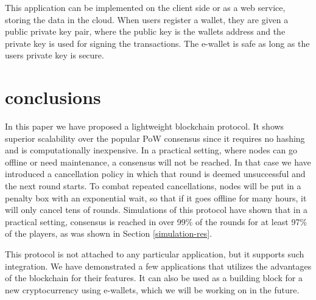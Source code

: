 \documentclass[10pt]{article}
\begin{document}
This application can be implemented on the client side or as a web service, storing the data in the cloud. When users register a wallet, they are given a public private key pair, where the public key is the wallets address and the private key is used for signing the transactions. The e-wallet is safe as long as the users private key is secure. 





\section{conclusions}
In this paper we have proposed a lightweight blockchain protocol. It shows superior scalability over the popular PoW consensus since it requires no hashing and is computationally inexpensive. In a practical setting, where nodes can go offline or need maintenance, a consensus will not be reached. In that case we have introduced a cancellation policy in which that round is deemed unsuccessful and the next round starts. To combat repeated cancellations, nodes will be put in a penalty box with an exponential wait, so that if it goes offline for many hours, it will only cancel tens of rounds. Simulations of this protocol have shown that in a practical setting, consensus is reached in over 99\% of the rounds for at least 97\% of the players, as was shown in Section \ref{simulation-res}. 

This protocol is not attached to any particular application, but it supports such integration. We have demonstrated a few applications that utilizes the advantages of the blockchain for their features. It can also be used as a building block for a new cryptocurrency using e-wallets, which we will be working on in the future.


\end{document}

